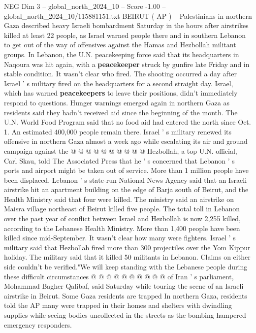 \begin{textsample}{NEG Dim 3 – global\_north\_2024\_10 – Score -1.00 – global\_north\_2024\_10/115881151.txt}  \label{ex:f3_neg_306}
BEIRUT ( AP ) -- Palestinians in northern Gaza described heavy Israeli bombardment Saturday in the hours after airstrikes killed at least 22 people, as Israel warned people there and in southern Lebanon to get out of the way of offensives against the Hamas and Hezbollah militant groups.
In Lebanon, the U.N. peacekeeping force said that its headquarters in Naqoura was hit again, with a \textbf{peacekeeper} struck by gunfire late Friday and in stable condition.
It wasn't clear who fired.
The shooting occurred a day after Israel ' s military fired on the headquarters for a second straight day.
Israel, which has warned \textbf{peacekeepers} to leave their positions, didn't immediately respond to questions.
Hunger warnings emerged again in northern Gaza as residents said they hadn't received aid since the beginning of the month.
The U.N.
World Food Program said that no food aid had entered the north since Oct. 1.
An estimated 400,000 people remain there.
Israel ' s military renewed its offensive in northern Gaza almost a week ago while escalating its air and ground campaign against the @ @ @ @ @ @ @ @ @ @ Hezbollah, a top U.N. official, Carl Skau, told The Associated Press that he ' s concerned that Lebanon ' s ports and airport might be taken out of service.
More than 1 million people have been displaced.
Lebanon ' s state-run National News Agency said that an Israeli airstrike hit an apartment building on the edge of Barja south of Beirut, and the Health Ministry said that four were killed.
The ministry said an airstrike on Maisra village northeast of Beirut killed five people.
The total toll in Lebanon over the past year of conflict between Israel and Hezbollah is now 2,255 killed, according to the Lebanese Health Ministry.
More than 1,400 people have been killed since mid-September.
It wasn't clear how many were fighters.
Israel ' s military said that Hezbollah fired more than 300 projectiles over the Yom Kippur holiday.
The military said that it killed 50 militants in Lebanon.
Claims on either side couldn't be verified."We will keep standing with the Lebanese people during these difficult circumstances @ @ @ @ @ @ @ @ @ @ of Iran ' s parliament, Mohammad Bagher Qalibaf, said Saturday while touring the scene of an Israeli airstrike in Beirut.
Some Gaza residents are trapped In northern Gaza, residents told the AP many were trapped in their homes and shelters with dwindling supplies while seeing bodies uncollected in the streets as the bombing hampered emergency responders.

\end{textsample}
